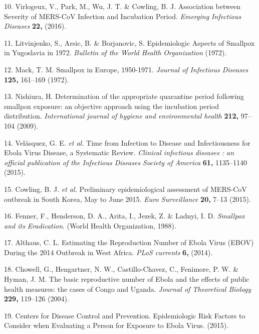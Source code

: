 \documentclass[]{article}
\begin{document}
\hypertarget{ref-Virlogeux:2016ty}{}
10. Virlogeux, V., Park, M., Wu, J. T. \& Cowling, B. J. Association
between Severity of MERS-CoV Infection and Incubation Period.
\emph{Emerging Infectious Diseases} \textbf{22,} (2016).

\hypertarget{ref-Litvinjenko:1972vp}{}
11. Litvinjenko, S., Arsic, B. \& Borjanovic, S. Epidemiologic Aspects
of Smallpox in Yugoslavia in 1972. \emph{Bulletin of the World Health
Organization} (1972).

\hypertarget{ref-Mack:1972jc}{}
12. Mack, T. M. Smallpox in Europe, 1950-1971. \emph{Journal of
Infectious Diseases} \textbf{125,} 161--169 (1972).

\hypertarget{ref-Nishiura:2009dh}{}
13. Nishiura, H. Determination of the appropriate quarantine period
following smallpox exposure: an objective approach using the incubation
period distribution. \emph{International journal of hygiene and
environmental health} \textbf{212,} 97--104 (2009).

\hypertarget{ref-Velasquez:2015gv}{}
14. Velásquez, G. E. \emph{et al.} Time from Infection to Disease and
Infectiousness for Ebola Virus Disease, a Systematic Review.
\emph{Clinical infectious diseases : an official publication of the
Infectious Diseases Society of America} \textbf{61,} 1135--1140 (2015).

\hypertarget{ref-Cowling:2015vb}{}
15. Cowling, B. J. \emph{et al.} Preliminary epidemiological assessment
of MERS-CoV outbreak in South Korea, May to June 2015. \emph{Euro
Surveillance} \textbf{20,} 7--13 (2015).

\hypertarget{ref-Fenner:1988ux}{}
16. Fenner, F., Henderson, D. A., Arita, I., Jezek, Z. \& Ladnyi, I. D.
\emph{Smallpox and its Eradication}. (World Health Organization, 1988).

\hypertarget{ref-Althaus:2014cw}{}
17. Althaus, C. L. Estimating the Reproduction Number of Ebola Virus
(EBOV) During the 2014 Outbreak in West Africa. \emph{PLoS currents}
\textbf{6,} (2014).

\hypertarget{ref-Chowell:2004gh}{}
18. Chowell, G., Hengartner, N. W., Castillo-Chavez, C., Fenimore, P. W.
\& Hyman, J. M. The basic reproductive number of Ebola and the effects
of public health measures: the cases of Congo and Uganda. \emph{Journal
of Theoretical Biology} \textbf{229,} 119--126 (2004).

\hypertarget{ref-CentersforDiseaseControlandPrevention:2015tc}{}
19. Centers for Disease Control and Prevention. Epidemiologic Risk
Factors to Consider when Evaluating a Person for Exposure to Ebola
Virus. (2015).
\end{document}
